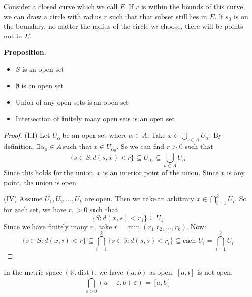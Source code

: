 \documentclass{report}
\begin{document}
Consider a closed curve which we call $E$. If $r$ is within the bounds of this curve, we can draw a circle with radius $r$ such that that subset still lies in $E$. If $s_{0}$ is on the boundary, no matter the radius of the circle we choose, there will be points not in $E$.

\textbf{Proposition}: 
    \begin{itemize}
        \item  $S$ is an open set

        \item  $\emptyset$ is an open set

        \item Union of any open sets is an open set

        \item Intersection of finitely many open sets is an open set 
    \end{itemize}
\begin{proof}
    (III) Let $U_{\alpha}$ be an open set where $\alpha \in A$. Take $x \in \bigcup_{a\in A}^{} U_{\alpha}$. By definition, $\exists \alpha_{0} \in A$ such that $x \in U_{\alpha_{0}}$. So we can find $r > 0$ such that 
        \begin{equation*}
            \{s \in S : d(s, x) < r\} \subseteq U_{\alpha_{0}} \subseteq \bigcup_{a \in A}^{} U_{\alpha}
        \end{equation*}
    Since this holds for the union, $x$ is an interior point of the union. Since $x$ is any point, the union is open.

    (IV) Assume $U_{1}, U_{2}, \ldots , U_{k}$ are open. Then we take an arbitrary $x \in \bigcap_{i = 1}^{k} U_{i}$. So for each set, we have $r_{1} > 0$ such that
        \begin{equation*}
            \{S : d(x, s) < r_{1}\} \subseteq U_{1}
        \end{equation*}
    Since we have finitely many $r_{i}$, take $r = \min(r_{1}, r_{2}, \ldots , r_{k})$. Now:
        \begin{equation*}
            \{s \in S : d(x, s) < r\} \subseteq \bigcap_{i = 1}^{k} \{s \in S : d(s, s) < r_{i}\} \subseteq \text{each $U_{i}$} = \bigcap_{i = 1}^{k} U_{i}
        \end{equation*}
\end{proof}

\begin{examples}
    \begin{example}
        In the metric space $(\mathbb{R}, \text{dist})$, we have $(a, b)$ as open. $[a, b]$ is not open.
            \begin{equation*}
                \bigcap_{\varepsilon> 0}^{} (a - \varepsilon, b + \varepsilon) = [a, b]
            \end{equation*}
    \end{example}
\end{examples}
\end{document}
